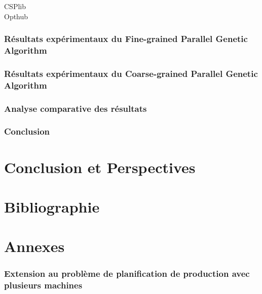\documentclass[12pt,a4paper]{article}
\begin{document}
		\begin{description}
			\item[CSPlib] 
			\item[Opthub]
		\end{description}
		
		\section{Résultats expérimentaux du Fine-grained Parallel Genetic Algorithm}
		\section{Résultats expérimentaux du Coarse-grained Parallel Genetic Algorithm}
		\section{Analyse comparative des résultats}
		\section*{Conclusion}
		
	\newpage
		
	\part*{Conclusion et Perspectives}
	
	\newpage
	
	\part*{Bibliographie}
	
	\newpage
	
	\appendix
	\part*{Annexes}
	\section{Extension au problème de planification de production avec plusieurs machines}
\end{document}
